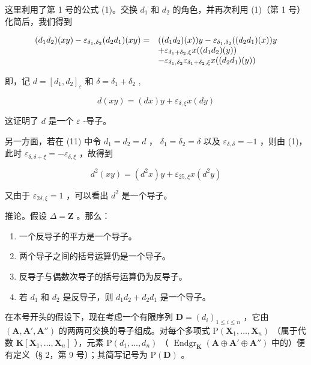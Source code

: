 这里利用了第 1 号的公式 (1)。交换 \(d_1\) 和 \(d_2\) 的角色，并再次利用 (1)（第 1 号）化简后，我们得到

\[
\begin{array}{r l} (d _ {1} d _ {2}) (x y) - \varepsilon_ {\delta_ {1}, \delta_ {2}} (d _ {2} d _ {1}) (x y) = & ((d _ {1} d _ {2}) (x)) y - \varepsilon_ {\delta_ {1}, \delta_ {2}} ((d _ {2} d _ {1}) (x)) y \\ & + \varepsilon_ {\delta_ {1} + \delta_ {2}, \xi} x ((d _ {1} d _ {2}) (y)) \\ & - \varepsilon_ {\delta_ {1}, \delta_ {2}} \varepsilon_ {\delta_ {1} + \delta_ {2}, \xi} x ((d _ {2} d _ {1}) (y)) \end{array}
\]

即，记 \(d = [d_1, d_2]_{\varepsilon}\) 和 \(\delta = \delta_1 + \delta_2\) ,

\[
d (x y) = (d x) y + \varepsilon_ {\delta , \xi} x (d y)
\]

这证明了 \(d\) 是一个 \(\varepsilon\) -导子。

另一方面，若在 (11) 中令 \(d_1 = d_2 = d\) ， \(\delta_1 = \delta_2 = \delta\) 以及 \(\varepsilon_{\delta,\delta} = -1\) ，则由 (1)，此时 \(\varepsilon_{\delta,\delta + \xi} = -\varepsilon_{\delta,\xi}\) ，故得到

\[
d ^ {2} (x y) = \left(d ^ {2} x\right) y + \varepsilon_ {2 5, \xi} x \left(d ^ {2} y\right)
\]

又由于 \(\varepsilon_{2\delta, \xi} = 1\) ，可以看出 \(d^2\) 是一个导子。

推论。假设 \(\Delta = \mathbf{Z}\) 。那么：

\begin{enumerate}
\def\labelenumi{(\roman{enumi})}
\item
  一个反导子的平方是一个导子。
\item
  两个导子之间的括号运算仍是一个导子。
\item
  反导子与偶数次导子的括号运算仍为反导子。
\item
  若 \(d_1\) 和 \(d_2\) 是反导子，则 \(d_1d_2 + d_2d_1\) 是一个导子。
\end{enumerate}

在本号开头的假设下，现在考虑一个有限序列 \(\mathbf{D} = (d_i)_{1 \leqslant i \leqslant n}\) ，它由 \((\mathbf{A}, \mathbf{A}', \mathbf{A}'')\) 的两两可交换的导子组成。对每个多项式 \(\mathrm{P}(\mathbf{X}_1, \ldots, \mathbf{X}_n)\) （属于代数 \(\mathbf{K}[\mathbf{X}_1, \ldots, \mathbf{X}_n]\) ），元素 \(\mathrm{P}(d_1, \ldots, d_n)\) （ \(\operatorname{Endgr}_{\mathbf{K}}(\mathbf{A} \oplus \mathbf{A}' \oplus \mathbf{A}'')\) 中的）便有定义（§ 2，第 9 号）；其简写记号为 \(\mathrm{P}(\mathbf{D})\) 。

